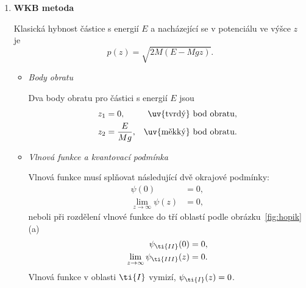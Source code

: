\begin{solution}
    \begin{enumerate}
        \item\textbf{WKB metoda}
        
            Klasická hybnost částice s energií $E$ a nacházející se v potenciálu ve výšce $z$ je
            \begin{equation}
                p(z)=\sqrt{2M\left(E-Mgz\right)}.
            \end{equation}

            \begin{itemize}
                \item\emph{Body obratu}
            
                    Dva body obratu pro částici s energií $E$ jsou
                    \begin{align}
                        z_{1}&=0, & \text{\uv{tvrdý} bod obratu,}\\
                        z_{2}&=\frac{E}{Mg}, &\text{\uv{měkký} bod obratu}.
                    \end{align}

                \item\emph{Vlnová funkce a kvantovací podmínka}
            
                    Vlnová funkce musí splňovat následující dvě okrajové podmínky:
                    \begin{align}
                        \label{eq:psi0}
                        \psi(0)&=0,\\
                        \label{eq:psiinfty}
                        \lim_{z\rightarrow\infty}\psi(z)&=0,
                    \end{align}
                    neboli při rozdělení vlnové funkce do tří oblastí podle obrázku~\ref{fig:hopik}(a)
                    \begin{align}
                        \label{eq:psiII0}
                        \psi_{\ti{II}}(0)&=0,\\
                        \label{eq:psiIIIinfty}
                        \lim_{z\rightarrow\infty}\psi_{\ti{III}}(z)&=0.
                    \end{align}
                    Vlnová funkce v oblasti $\ti{I}$ vymizí, $\psi_{\ti{I}}(z)=0$.


\end{itemize}
\end{enumerate}
\end{solution}
